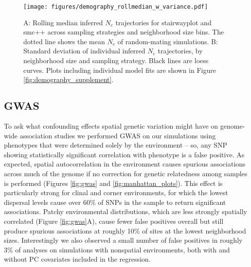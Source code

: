 \documentclass[10pt,twoside,lineno,hidelinks]{preprint} %
\begin{document}
\begin{figure}[p]
\centering
\texttt{[image: figures/demography\_rollmedian\_w\_variance.pdf]}
\caption{A: Rolling median inferred $N_{e}$ trajectories for stairwayplot and smc++ across sampling strategies and neighborhood size bins. The dotted line shows the mean $N_{e}$ of random-mating simulations. B: Standard deviation of individual inferred $N_{e}$ trajectories, by neighborhood size and sampling strategy. Black lines are loess curves. Plots including individual model fits are shown in Figure \ref{fig:demography_supplement}.}
\label{fig:demography}
\end{figure}

\subsection{GWAS}

To ask what confounding effects spatial genetic variation might have on genome-wide association studies we performed GWAS on our simulations using phenotypes that were determined solely by the environment
-- so, any SNP showing statistically significant correlation with phenotype is a false positive. 
As expected, spatial autocorrelation in the environment causes spurious associations 
across much of the genome if no correction for genetic relatedness among samples is performed (Figures \ref{fig:gwas} and \ref{fig:manhattan_plots}). 
This effect is particularly strong for clinal and corner environments, 
for which the lowest dispersal levels cause over 60\% of SNPs in the sample to return significant associations. 
Patchy environmental distributions, which are less strongly spatially correlated (Figure \ref{fig:gwas}A), 
cause fewer false positives overall but still produce spurious associations at roughly 10\% of sites at the lowest neighborhood sizes. 
Interestingly we also observed a small number of false positives in roughly 3\% of analyses on simulations with nonspatial environments, both with and without PC covariates included in the regression.
\end{document}
